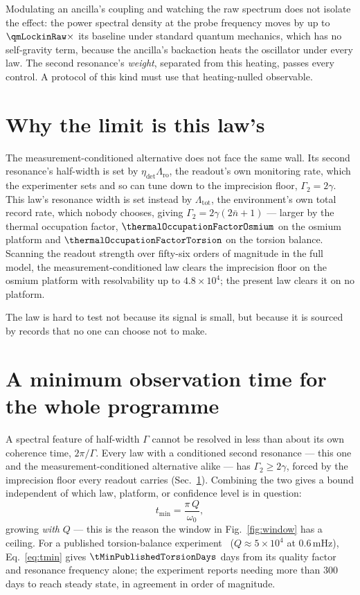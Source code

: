 \documentclass[aps,pra,reprint,amsmath,amssymb,superscriptaddress]{revtex4-2}
\begin{document}
Modulating an ancilla's coupling and watching the raw spectrum does not
isolate the effect: the power spectral density at the probe frequency moves by
up to $\qmLockinRaw\times$ its baseline under standard quantum mechanics,
which has no self-gravity term, because the ancilla's backaction heats the
oscillator under every law. The second resonance's \emph{weight}, separated
from this heating, passes every control. A protocol of this kind must use
that heating-nulled observable. %

\section{Why the limit is this law's}
\label{sec:why}

The measurement-conditioned alternative does not face the same wall. Its
second resonance's half-width is set by $\eta_{\det}\Lambda_{\mathrm{ro}}$,
the readout's own monitoring rate, which the experimenter sets and so can
tune down to the imprecision floor, $\Gamma_2=2\gamma$. This law's resonance
width is set instead by $\Lambda_{\mathrm{tot}}$, the environment's own total
record rate, which nobody chooses, giving $\Gamma_2=2\gamma(2\bar n+1)$ --- larger by the thermal occupation factor, $\thermalOccupationFactorOsmium$ on
the osmium platform and $\thermalOccupationFactorTorsion$ on the torsion
balance. %
Scanning the readout strength over fifty-six orders of magnitude in the full
model, the measurement-conditioned law clears the imprecision floor on the
osmium platform with resolvability up to $4.8\times10^4$; the present law
clears it on no platform.

The law is hard to test not because its signal is small, but because it is
sourced by records that no one can choose not to make.

\section{A minimum observation time for the whole programme}
\label{sec:mintime}

A spectral feature of half-width $\Gamma$ cannot be resolved in less than
about its own coherence time, $2\pi/\Gamma$. Every law with a conditioned
second resonance --- this one and the measurement-conditioned alternative
alike --- has $\Gamma_2\ge2\gamma$, forced by the imprecision floor every
readout carries (Sec.~\ref{sec:why}). Combining the two gives a bound
independent of which law, platform, or confidence level is in question:
\begin{equation}
  t_{\min} = \frac{\pi\,Q}{\omega_0},
  \label{eq:tmin}
\end{equation}
growing \emph{with} $Q$ --- this is the reason the window in
Fig.~\ref{fig:window} has a ceiling. For a published torsion-balance
experiment~\cite{Y25} ($Q\approx5\times10^4$ at $0.6\,\mathrm{mHz}$),
Eq.~\eqref{eq:tmin} gives $\tMinPublishedTorsionDays$ days from its quality
factor and resonance frequency alone; the experiment reports needing more than
$300$ days to reach steady state, in agreement in order of magnitude.
\end{document}
